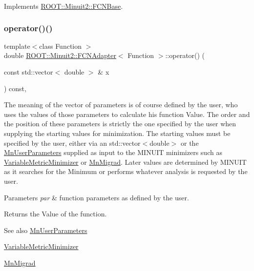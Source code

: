 Implements \mbox{\hyperlink{classROOT_1_1Minuit2_1_1FCNBase_ae4a86bd94d0d0f5ca6fc8f8ab2bb43cd}{R\+O\+O\+T\+::\+Minuit2\+::\+F\+C\+N\+Base}}.

\mbox{\label{classROOT_1_1Minuit2_1_1FCNAdapter_a3d400764a6828594b68a00b905d450b2}} 
\subsubsection{\texorpdfstring{operator()()}{operator()()}\hspace{0.1cm}{\footnotesize\ttfamily [3/6]}}
{\footnotesize\ttfamily template$<$class Function $>$ \\
double \mbox{\hyperlink{classROOT_1_1Minuit2_1_1FCNAdapter}{R\+O\+O\+T\+::\+Minuit2\+::\+F\+C\+N\+Adapter}}$<$ Function $>$\+::operator() (\begin{DoxyParamCaption}\item[{const std\+::vector$<$ double $>$ \&}]{x }\end{DoxyParamCaption}) const\hspace{0.3cm}{\ttfamily [inline]}, {\ttfamily [virtual]}}

The meaning of the vector of parameters is of course defined by the user, who uses the values of those parameters to calculate his function Value. The order and the position of these parameters is strictly the one specified by the user when supplying the starting values for minimization. The starting values must be specified by the user, either via an std\+::vector$<$double$>$ or the \mbox{\hyperlink{classROOT_1_1Minuit2_1_1MnUserParameters}{Mn\+User\+Parameters}} supplied as input to the M\+I\+N\+U\+IT minimizers such as \mbox{\hyperlink{classROOT_1_1Minuit2_1_1VariableMetricMinimizer}{Variable\+Metric\+Minimizer}} or \mbox{\hyperlink{classROOT_1_1Minuit2_1_1MnMigrad}{Mn\+Migrad}}. Later values are determined by M\+I\+N\+U\+IT as it searches for the Minimum or performs whatever analysis is requested by the user.


\begin{DoxyParams}{Parameters}
{\em par} & function parameters as defined by the user.\\
\hline
\end{DoxyParams}
\begin{DoxyReturn}{Returns}
the Value of the function.
\end{DoxyReturn}
\begin{DoxySeeAlso}{See also}
\mbox{\hyperlink{classROOT_1_1Minuit2_1_1MnUserParameters}{Mn\+User\+Parameters}} 

\mbox{\hyperlink{classROOT_1_1Minuit2_1_1VariableMetricMinimizer}{Variable\+Metric\+Minimizer}} 

\mbox{\hyperlink{classROOT_1_1Minuit2_1_1MnMigrad}{Mn\+Migrad}} 
\end{DoxySeeAlso}


